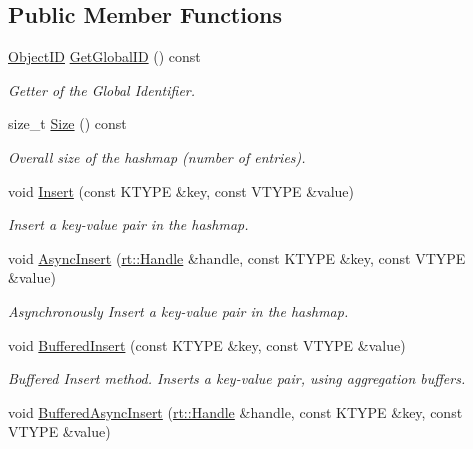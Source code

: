 \subsection*{Public Member Functions}
\begin{DoxyCompactItemize}
\item 
\hyperlink{classshad_1_1Hashmap_a1f10a3b0cce639008b5b9444eb167f8b}{Object\-I\-D} \hyperlink{classshad_1_1Hashmap_a7a7242cd82188b05280e4f8faaeac387}{Get\-Global\-I\-D} () const 
\begin{DoxyCompactList}\small\item\em Getter of the Global Identifier. \end{DoxyCompactList}\item 
size\-\_\-t \hyperlink{classshad_1_1Hashmap_ae05da08d72f0a2097a64603f49cc91ac}{Size} () const 
\begin{DoxyCompactList}\small\item\em Overall size of the hashmap (number of entries). \end{DoxyCompactList}\item 
void \hyperlink{classshad_1_1Hashmap_af3f0622044572a21c74f192714065f5f}{Insert} (const K\-T\-Y\-P\-E \&key, const V\-T\-Y\-P\-E \&value)
\begin{DoxyCompactList}\small\item\em Insert a key-\/value pair in the hashmap. \end{DoxyCompactList}\item 
void \hyperlink{classshad_1_1Hashmap_a6cfddc1040192ee87e5c41f443e6557d}{Async\-Insert} (\hyperlink{classshad_1_1rt_1_1Handle}{rt\-::\-Handle} \&handle, const K\-T\-Y\-P\-E \&key, const V\-T\-Y\-P\-E \&value)
\begin{DoxyCompactList}\small\item\em Asynchronously Insert a key-\/value pair in the hashmap. \end{DoxyCompactList}\item 
void \hyperlink{classshad_1_1Hashmap_a94e4c630fc430e83776f8a34fcae06c2}{Buffered\-Insert} (const K\-T\-Y\-P\-E \&key, const V\-T\-Y\-P\-E \&value)
\begin{DoxyCompactList}\small\item\em Buffered Insert method. Inserts a key-\/value pair, using aggregation buffers. \end{DoxyCompactList}\item 
void \hyperlink{classshad_1_1Hashmap_a81d82387ec408ec61db465e60401c77a}{Buffered\-Async\-Insert} (\hyperlink{classshad_1_1rt_1_1Handle}{rt\-::\-Handle} \&handle, const K\-T\-Y\-P\-E \&key, const V\-T\-Y\-P\-E \&value)

\end{DoxyCompactItemize}
